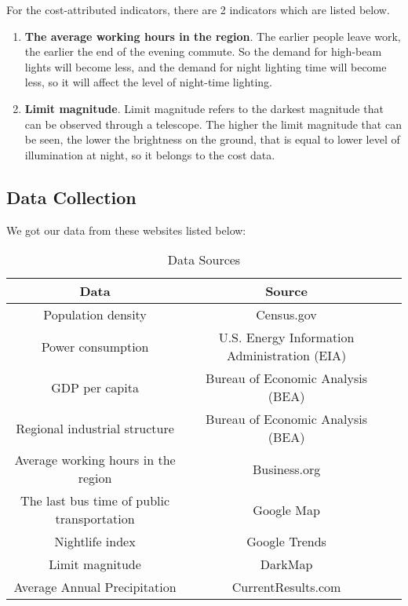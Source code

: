 For the cost-attributed indicators, there are 2 indicators which are listed below.
\begin{enumerate}
    \item \textbf{The average working hours in the region}. The earlier people leave work, the earlier the end of the evening commute. So the demand for high-beam lights will become less, and the demand for night lighting time will become less, so it will affect the level of night-time lighting.
    
    \item \textbf{Limit magnitude}. Limit magnitude refers to the darkest magnitude that can be observed through a telescope. The higher the limit magnitude that can be seen, the lower the brightness on the ground, that is equal to lower level of illumination at night, so it belongs to the cost data.
\end{enumerate}


\subsection{Data Collection}
We got our data from these websites listed below:
\begin{table}[H] \centering
    \caption{Data Sources}
    \begin{tabular}{ccl}
        \toprule
        Data & Source\\ \hline
        Population density & Census.gov \cite{bureau_historical_nodate} \\
        Power consumption & U.S. Energy Information Administration (EIA) \cite{eia} \\
        GDP per capita & Bureau of Economic Analysis (BEA)\cite{bea} \\
        Regional industrial structure & Bureau of Economic Analysis (BEA)\cite{bea} \\
        Average working hours in the region & Business.org \cite{overwork}\\
        The last bus time of public transportation & Google Map \cite{google_map}\\
        Nightlife index & Google Trends \cite{nightlife_index} \\
        Limit magnitude & DarkMap \cite{darkmap} \\
        Average Annual Precipitation & CurrentResults.com \cite{currentresults} \\
        \bottomrule
    \end{tabular}
\end{table}

